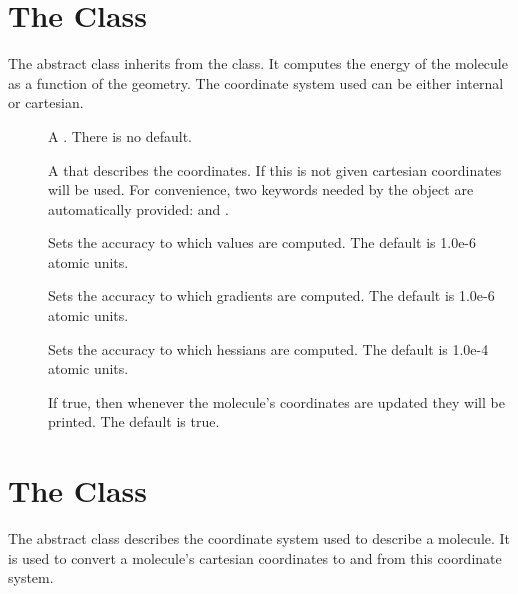 \section{The  Class}\label{MolecularEnergy}

The  abstract class inherits from the
 class.  It computes the energy of the
molecule as a function of the geometry.  The coordinate system
used can be either internal or cartesian.

\begin{description}
  \item[] A 
    .  There is no default.

  \item[] A 
     that describes the coordinates.  If this is
    not given cartesian coordinates will be used.  For convenience, two
    keywords needed by the  object are
    automatically provided:  and .

  \item[] Sets the accuracy to which values are
    computed.  The default is 1.0e-6 atomic units.

  \item[] Sets the accuracy to which gradients
    are computed.  The default is 1.0e-6 atomic units.

  \item[] Sets the accuracy to which hessians are
    computed.  The default is 1.0e-4 atomic units.

  \item[] If true, then whenever the
    molecule's coordinates are updated they will be printed.  The default
    is true.
\end{description}


\section{The  Class}\label{MolecularCoor}

The  abstract class describes the coordinate system
used to describe a molecule.  It is used to convert a molecule's cartesian
coordinates to and from this coordinate system.

